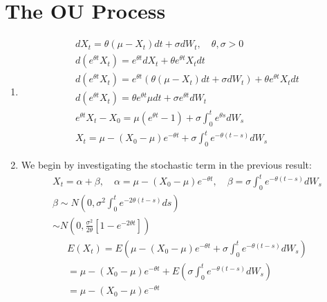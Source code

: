 \documentclass{article}
\begin{document}
\section{The OU Process}
    \begin{enumerate}
        \item 
            \begin{gather*}
                dX_t = \theta(\mu-X_t)dt + \sigma dW_t, \quad \theta, \sigma > 0
                \\
                d(e^{\theta t}X_t) = e^{\theta t}dX_t + \theta e^{\theta t}X_tdt
                \\
                d(e^{\theta t}X_t) =  e^{\theta t}\left(\theta(\mu-X_t)dt +
                \sigma dW_t\right) + \theta e^{\theta t}X_t dt
                \\
                d(e^{\theta t}X_t) = \theta e^{\theta t}\mu dt +
                \sigma e^{\theta t} dW_t
                \\
                e^{\theta t}X_t - X_0 = \mu (e^{\theta t} - 1) + \sigma \int_0^t e^{\theta s}dW_s
                \\
                X_t = \mu - (X_0 - \mu)e^{-\theta t} + \sigma \int_0^t e^{-\theta
                (t - s)}dW_s
            \end{gather*}
        \item 
            We begin by investigating the stochastic term in the previous
            result: 
            \begin{gather*}
                X_t = \alpha + \beta, \quad \alpha = \mu - (X_0 - \mu)e^{-\theta
                t}, \quad \beta = \sigma \int_0^t e^{-\theta (t - s)}dW_s
                \\
                \beta \sim N(0,
                \sigma^2\int_0^t e^{-2\theta (t - s)}ds)
                \\
                \sim N\left(0, \frac{\sigma^2}{2\theta}\left[1 -  e^{-2\theta t}\right]\right)
            \end{gather*}
            \begin{gather*}
                E(X_t) = E\left(\mu - (X_0 - \mu)e^{-\theta t} + \sigma \int_0^t e^{-\theta
                (t - s)}dW_s\right)
                \\
                = \mu - (X_0 - \mu)e^{-\theta t} + E(\sigma \int_0^t e^{-\theta
                (t - s)}dW_s) 
                \\
                = \mu - (X_0 - \mu)e^{-\theta t}
            \end{gather*} 

\end{enumerate}
\end{document}
